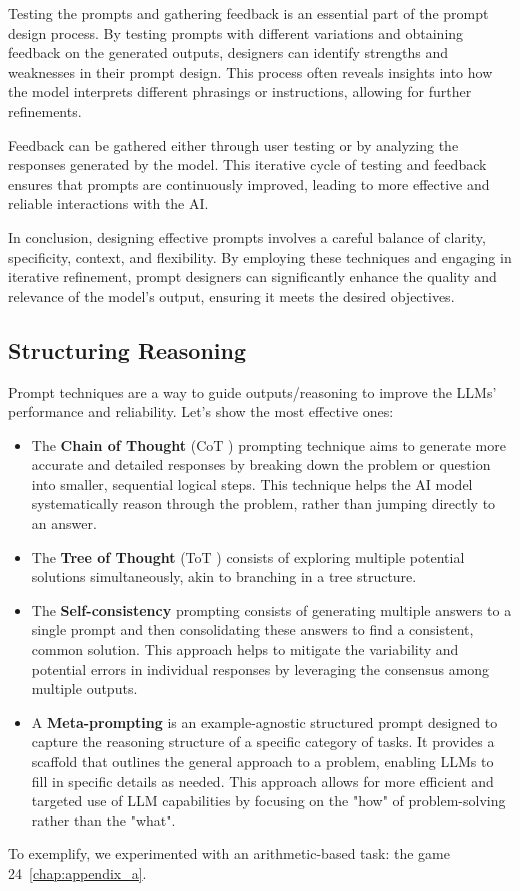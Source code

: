Testing the prompts and gathering feedback is an essential part of the prompt design process. By testing prompts with different variations and obtaining feedback on the generated outputs, designers can identify strengths and weaknesses in their prompt design. This process often reveals insights into how the model interprets different phrasings or instructions, allowing for further refinements.

Feedback can be gathered either through user testing or by analyzing the responses generated by the model. This iterative cycle of testing and feedback ensures that prompts are continuously improved, leading to more effective and reliable interactions with the AI.

In conclusion, designing effective prompts involves a careful balance of clarity, specificity, context, and flexibility. By employing these techniques and engaging in iterative refinement, prompt designers can significantly enhance the quality and relevance of the model's output, ensuring it meets the desired objectives.

\subsection{Structuring Reasoning}
Prompt techniques are a way to guide outputs/reasoning to improve the LLMs' performance and reliability. Let's show the most effective ones:
\begin{itemize}
    \item The \textbf{Chain of Thought} (CoT \cite{wei2023chainofthought}) prompting technique aims to generate more accurate and detailed responses by breaking down the problem or question into smaller, sequential logical steps. This technique helps the AI model systematically reason through the problem, rather than jumping directly to an answer.
    
    \item The \textbf{Tree of Thought} (ToT \cite{yao2023tree}) consists of exploring multiple potential solutions simultaneously, akin to branching in a tree structure.
    
    \item The \textbf{Self-consistency} \cite{wang2023selfconsistency} prompting consists of generating multiple answers to a single prompt and then consolidating these answers to find a consistent, common solution. This approach helps to mitigate the variability and potential errors in individual responses by leveraging the consensus among multiple outputs. 

    \item A \textbf{Meta-prompting} \cite{zhang2024metapromptingaisystems} is an example-agnostic structured prompt designed to capture the reasoning structure of a specific category of tasks. It provides a scaffold that outlines the general approach to a problem, enabling LLMs to fill in specific details as needed. This approach allows for more efficient and targeted use of LLM capabilities by focusing on the "how" of problem-solving rather than the "what".
\end{itemize}
To exemplify, we experimented with an arithmetic-based task: the game 24~\ref{chap:appendix_a}.

